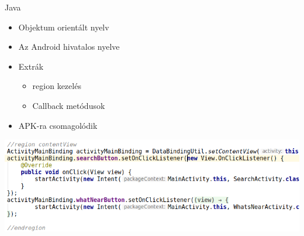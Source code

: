 \documentclass{beamer}
\begin{document}
\begin{frame}[fragile]{Java}
	\begin{minipage}{0.9\textwidth}
		\begin{itemize}
			\item Objektum orientált nyelv
			\item Az Android hivatalos nyelve
			\item Extrák
			\begin{itemize}
				\item region kezelés
				\item Callback metódusok
			\end{itemize}
			\item APK-ra csomagolódik
		\end{itemize}
	\end{minipage}
	\begin{minipage}{1\textheight}
		\centering
		\includegraphics[width=1\linewidth]{figures/regionCallback.jpg}
	\end{minipage}
\end{frame}
\end{document}
